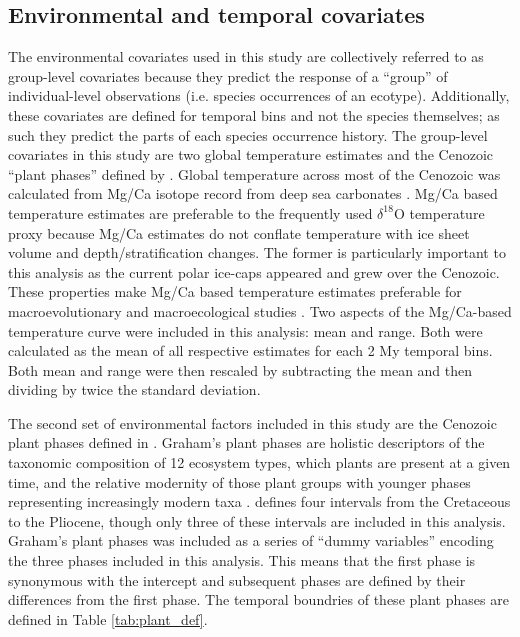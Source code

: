 \documentclass[12pt,letterpaper]{article}
\begin{document}
\subsection*{Environmental and temporal covariates}
The environmental covariates used in this study are collectively referred to as group-level covariates because they predict the response of a ``group'' of individual-level observations (i.e. species occurrences of an ecotype). Additionally, these covariates are defined for temporal bins and not the species themselves; as such they predict the parts of each species occurrence history. The group-level covariates in this study are two global temperature estimates and the Cenozoic ``plant phases'' defined by \citet{Graham2011a}. Global temperature across most of the Cenozoic was calculated from Mg/Ca isotope record from deep sea carbonates \citep{Cramer2011}. Mg/Ca based temperature estimates are preferable to the frequently used \(\delta^{18}\)O temperature proxy \citep{Zachos2001,Zachos2008,Alroy2000g,Figueirido2012} because Mg/Ca estimates do not conflate temperature with ice sheet volume and depth/stratification changes. The former is particularly important to this analysis as the current polar ice-caps appeared and grew over the Cenozoic. These properties make Mg/Ca based temperature estimates preferable for macroevolutionary and macroecological studies \citep{Ezard2016a}. Two aspects of the Mg/Ca-based temperature curve were included in this analysis: mean and range. Both were calculated as the mean of all respective estimates for each 2 My temporal bins. Both mean and range were then rescaled by subtracting the mean and then dividing by twice the standard deviation. 

The second set of environmental factors included in this study are the Cenozoic plant phases defined in \citet{Graham2011a}. Graham's plant phases are holistic descriptors of the taxonomic composition of 12 ecosystem types, which plants are present at a given time, and the relative modernity of those plant groups with younger phases representing increasingly modern taxa \citep{Graham2011a}. \citet{Graham2011a} defines four intervals from the Cretaceous to the Pliocene, though only three of these intervals are included in this analysis. Graham's plant phases was included as a series of ``dummy variables'' encoding the three phases included in this analysis. This means that the first phase is synonymous with the intercept and subsequent phases are defined by their differences from the first phase. The temporal boundries of these plant phases are defined in Table \ref{tab:plant_def}.
\end{document}
